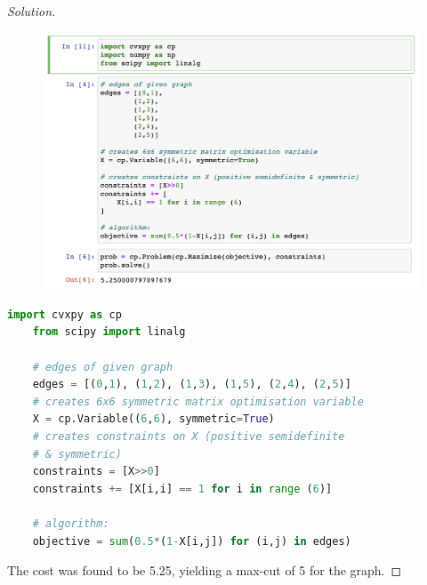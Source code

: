\documentclass[11pt]{article}
\newenvironment{question}[2][Question]{\begin{trivlist}
\item[\hskip \labelsep {\bfseries #1}\hskip \labelsep {\bfseries #2.}]}{\end{trivlist}}
\newenvironment{solution}{\begin{proof}[Solution]}{\end{proof}}
\begin{document}
\begin{question}{1}
\begin{enumerate}[(a)]
\begin{solution}
                \begin{figure}[H]
                    \centering
                    \includegraphics[scale=0.5]{Screen Shot 2022-12-19 at 22.59.27.png}
                \end{figure}

                \begin{lstlisting}[language=Python, caption=Python example]
    import cvxpy as cp
    from scipy import linalg

    # edges of given graph
    edges = [(0,1), (1,2), (1,3), (1,5), (2,4), (2,5)]
    # creates 6x6 symmetric matrix optimisation variable
    X = cp.Variable((6,6), symmetric=True)
    # creates constraints on X (positive semidefinite 
    # & symmetric)
    constraints = [X>>0]
    constraints += [X[i,i] == 1 for i in range (6)]
    
    # algorithm: 
    objective = sum(0.5*(1-X[i,j]) for (i,j) in edges)
                \end{lstlisting}

                The cost was found to be 5.25, yielding a max-cut of 5 for the graph.  
            \end{solution}
        \end{enumerate}
    \end{question}
\end{document}
